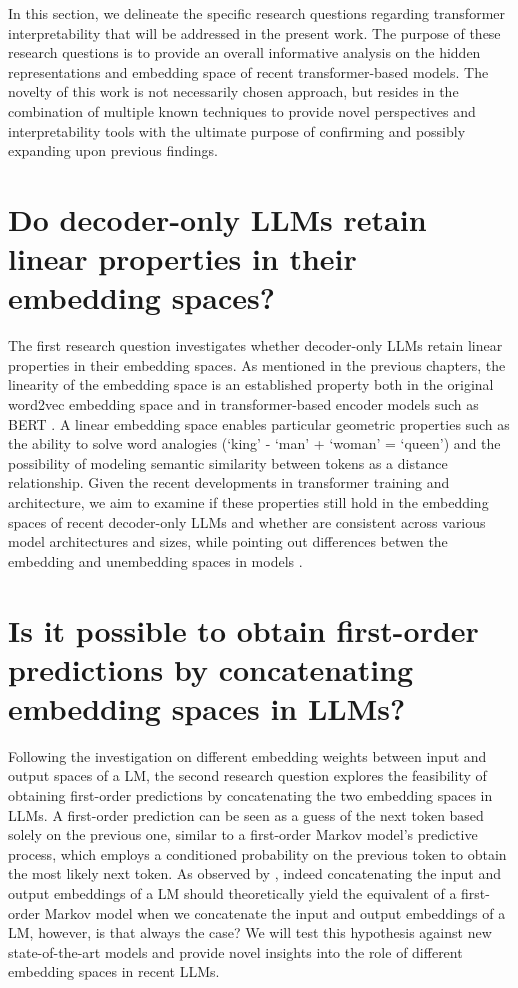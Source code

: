 In this section, we delineate the specific research questions regarding transformer interpretability that will be addressed in the present work.
The purpose of these research questions is to provide an overall informative analysis on the hidden representations and embedding space of recent transformer-based models.
The novelty of this work is not necessarily  chosen approach, but resides in the combination of multiple known techniques to provide novel perspectives and interpretability tools with the ultimate purpose of confirming and possibly expanding upon previous findings.

\section{Do decoder-only LLMs retain linear properties in their embedding spaces?}

The first research question investigates whether decoder-only LLMs retain linear properties in their embedding spaces.
As mentioned in the previous chapters, the linearity of the embedding space is an established property both in the original word2vec embedding space \cite{mikolov2013} and in transformer-based encoder models such as BERT .
A linear embedding space enables particular geometric properties such as the ability to solve word analogies (`king' - `man' + `woman' = `queen') and the possibility of modeling semantic similarity between tokens as a distance relationship.
Given the recent developments in transformer training and architecture, we aim to examine if these properties still hold in the embedding spaces of recent decoder-only LLMs and whether  are consistent across various model architectures and sizes, while pointing out differences betwen the embedding and unembedding spaces in models .

\section{Is it possible to obtain first-order predictions by concatenating embedding spaces in LLMs?}

Following the investigation on different embedding weights between input and output spaces of a LM, the second research question explores the feasibility of obtaining first-order predictions by concatenating the two embedding spaces in LLMs.
A first-order prediction can be seen as a guess of the next token based solely on the previous one, similar to a first-order Markov model's predictive process, which employs a conditioned probability on the previous token to obtain the most likely next token.
As observed by , indeed concatenating the input and output embeddings of a LM should theoretically yield the equivalent of a first-order Markov model when we concatenate the input and output embeddings of a LM, however, is that always the case?
We will test this hypothesis against new state-of-the-art models and provide novel insights into the role of different embedding spaces in recent LLMs.

